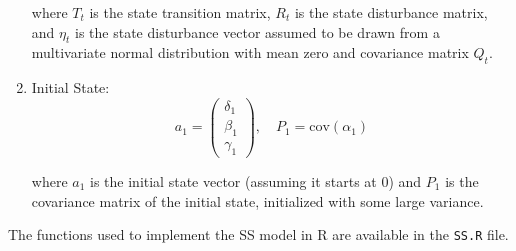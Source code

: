 \begin{enumerate}
  where $T_t$ is the state transition matrix, $R_t$ is the state disturbance matrix, and $\eta_t$ is the state disturbance vector assumed to be drawn from a multivariate normal distribution with mean zero and covariance matrix $Q_t$.

\item Initial State:
   \begin{equation*}
   a_1 = \begin{pmatrix} \delta_1 \\ \beta_1 \\ \gamma_1 \end{pmatrix}, \quad P_1 = \text{cov}(\alpha_1)
   \end{equation*}

where $a_1$ is the initial state vector (assuming it starts at 0) and $P_1$ is the covariance matrix of the initial state, initialized with some large variance.
\end{enumerate}

The functions used to implement the SS model in R are available in the \texttt{SS.R} file. 